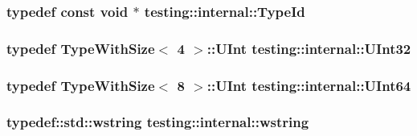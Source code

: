 \hypertarget{namespacetesting_1_1internal_a38c435cbab5f8b784e2e7f3356cab242}{
\subsubsection[{Type\-Id}]{\setlength{\rightskip}{0pt plus 5cm}typedef const void $\ast$ {\bf testing\-::internal\-::\-Type\-Id}}}\label{namespacetesting_1_1internal_a38c435cbab5f8b784e2e7f3356cab242}
\hypertarget{namespacetesting_1_1internal_a436defbb8e92c8e94e33ebcc86f278ba}{
\subsubsection[{U\-Int32}]{\setlength{\rightskip}{0pt plus 5cm}typedef {\bf Type\-With\-Size}$<$ 4 $>$\-::U\-Int {\bf testing\-::internal\-::\-U\-Int32}}}\label{namespacetesting_1_1internal_a436defbb8e92c8e94e33ebcc86f278ba}
\hypertarget{namespacetesting_1_1internal_ad24ae0a18ae0d3758b9a8333a0b56a4b}{
\subsubsection[{U\-Int64}]{\setlength{\rightskip}{0pt plus 5cm}typedef {\bf Type\-With\-Size}$<$ 8 $>$\-::U\-Int {\bf testing\-::internal\-::\-U\-Int64}}}\label{namespacetesting_1_1internal_ad24ae0a18ae0d3758b9a8333a0b56a4b}
\hypertarget{namespacetesting_1_1internal_ac7f852174ed7a0a1b1e830b4bbd7c020}{
\subsubsection[{wstring}]{\setlength{\rightskip}{0pt plus 5cm}typedef\-::std\-::wstring {\bf testing\-::internal\-::wstring}}}\label{namespacetesting_1_1internal_ac7f852174ed7a0a1b1e830b4bbd7c020}


